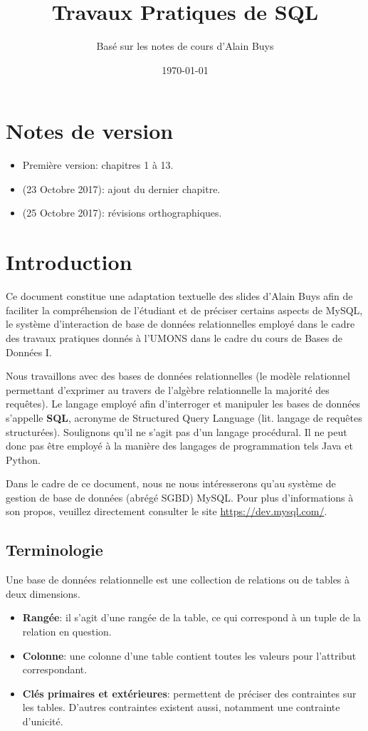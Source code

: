 \documentclass[a4paper, 12pt]{report}
\title{Travaux Pratiques de SQL}
\author{Basé sur les notes de cours d'Alain Buys}
\date{\today}
\theoremstyle{definition} \newtheorem{ex}{Exemple}
\begin{document}
\maketitle
\tableofcontents
\chapter*{Notes de version}
\begin{itemize}
  \item Première version: chapitres 1 à 13.
	\item (23 Octobre 2017): ajout du dernier chapitre.
	\item (25 Octobre 2017): révisions orthographiques.
\end{itemize}
\newpage
\chapter{Introduction}
Ce document constitue une adaptation textuelle des slides d'Alain Buys afin de faciliter la compréhension de l'étudiant et de préciser certains aspects de MySQL, le système d'interaction de base de données relationnelles employé dans le cadre des travaux pratiques donnés à l'UMONS dans le cadre du cours de Bases de Données I.

Nous travaillons avec des bases de données relationnelles (le modèle relationnel permettant d'exprimer au travers de l'algèbre relationnelle la majorité des requêtes). Le langage employé afin d'interroger et manipuler les bases de données s'appelle \textbf{SQL}, acronyme de Structured Query Language (lit. langage de requêtes structurées). Soulignons qu'il ne s'agit pas d'un langage procédural. Il ne peut donc pas être employé à la manière des langages de programmation tels Java et Python.

Dans le cadre de ce document, nous ne nous intéresserons qu'au système de gestion de base de données (abrégé SGBD) MySQL. Pour plus d'informations à son propos, veuillez directement consulter le site \url{https://dev.mysql.com/}.

\section{Terminologie}
Une base de données relationnelle est une collection de relations ou de tables à deux dimensions.
\begin{itemize}
\item \textbf{Rangée}: il s'agit d'une rangée de la table, ce qui correspond à un tuple de la relation en question.
\item \textbf{Colonne}: une colonne d'une table contient toutes les valeurs pour l'attribut correspondant.
\item \textbf{Clés primaires et extérieures}: permettent de préciser des contraintes sur les tables. D'autres contraintes existent aussi, notamment une contrainte d'unicité.
\end{itemize}
\end{document}
